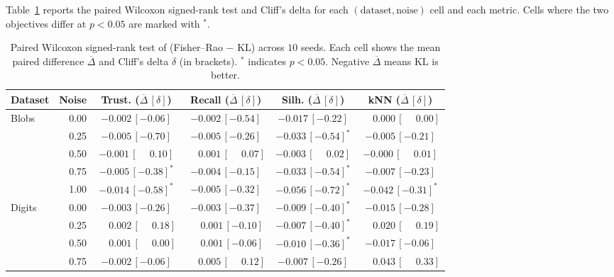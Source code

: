 \documentclass[11pt]{article}
\begin{document}
Table~\ref{tab:significance} reports the paired Wilcoxon signed-rank test and Cliff's delta
for each $(\text{dataset},\text{noise})$ cell and each metric. Cells where the two objectives
differ at $p<0.05$ are marked with $^{*}$.

\begin{table}[t]
  \centering
  \caption{Paired Wilcoxon signed-rank test of (Fisher--Rao $-$ KL) across $10$ seeds. Each
  cell shows the mean paired difference $\overline{\Delta}$ and Cliff's delta $\delta$ (in
  brackets). $^*$ indicates $p<0.05$. Negative $\overline{\Delta}$ means KL is better.}
  \label{tab:significance}
  \scriptsize
  \begin{tabular}{lrcccc}
    \toprule
    Dataset & Noise & Trust. ($\overline{\Delta}\,[\delta]$) & Recall ($\overline{\Delta}\,[\delta]$) & Silh. ($\overline{\Delta}\,[\delta]$) & kNN ($\overline{\Delta}\,[\delta]$) \\
    \midrule
    \multirow{5}{*}{Blobs}  & 0.00 & $-0.002\,[-0.06]$ & $-0.002\,[-0.54]$ & $-0.017\,[-0.22]$ & $\phantom{-}0.000\,[\phantom{-}0.00]$ \\
                           & 0.25 & $-0.005\,[-0.70]$ & $-0.005\,[-0.26]$ & $-0.033\,[-0.54]^{*}$ & $-0.005\,[-0.21]$ \\
                           & 0.50 & $-0.001\,[\phantom{-}0.10]$ & $\phantom{-}0.001\,[\phantom{-}0.07]$ & $-0.003\,[\phantom{-}0.02]$ & $-0.000\,[\phantom{-}0.01]$ \\
                           & 0.75 & $-0.005\,[-0.38]^{*}$ & $-0.004\,[-0.15]$ & $-0.033\,[-0.54]^{*}$ & $-0.007\,[-0.23]$ \\
                           & 1.00 & $-0.014\,[-0.58]^{*}$ & $-0.005\,[-0.32]$ & $-0.056\,[-0.72]^{*}$ & $-0.042\,[-0.31]^{*}$ \\
    \midrule
    \multirow{5}{*}{Digits} & 0.00 & $-0.003\,[-0.26]$ & $-0.003\,[-0.37]$ & $-0.009\,[-0.40]^{*}$ & $-0.015\,[-0.28]$ \\
                           & 0.25 & $\phantom{-}0.002\,[\phantom{-}0.18]$ & $\phantom{-}0.001\,[-0.10]$ & $-0.007\,[-0.40]^{*}$ & $\phantom{-}0.020\,[\phantom{-}0.19]$ \\
                           & 0.50 & $\phantom{-}0.001\,[\phantom{-}0.00]$ & $\phantom{-}0.001\,[-0.06]$ & $-0.010\,[-0.36]^{*}$ & $-0.017\,[-0.06]$ \\
                           & 0.75 & $-0.002\,[-0.06]$ & $\phantom{-}0.005\,[\phantom{-}0.12]$ & $-0.007\,[-0.26]$ & $\phantom{-}0.043\,[\phantom{-}0.33]$ \\

\end{tabular}
\end{table}
\end{document}
